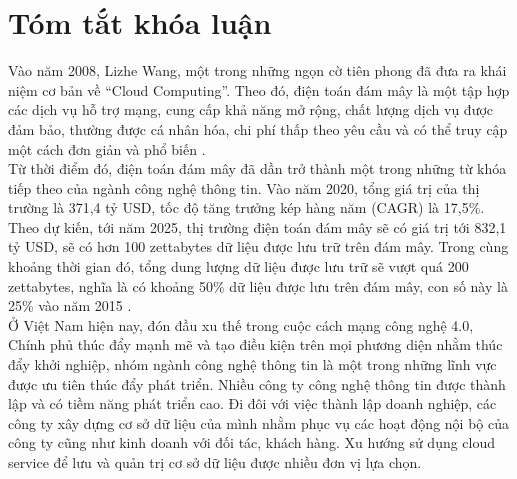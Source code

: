 \chapter*{\centering\Large{Tóm tắt khóa luận}}

Vào năm 2008, Lizhe Wang, một trong những ngọn cờ tiên phong đã đưa ra khái
niệm cơ bản về “Cloud Computing”. Theo đó, điện toán đám mây là một tập hợp các
dịch vụ hỗ trợ mạng, cung cấp khả năng mở rộng, chất lượng dịch vụ được đảm bảo,
thường được cá nhân hóa, chi phí thấp theo yêu cầu và có thể truy cập một cách đơn giản
và phổ biến \cite{wang2008scientific}.\\

Từ thời điểm đó, điện toán đám mây đã dần trở thành một trong những từ khóa
tiếp theo của ngành công nghệ thông tin. Vào năm 2020, tổng giá trị của thị trường là
371,4 tỷ USD, tốc độ tăng trưởng kép hàng năm (CAGR) là 17,5\%. Theo dự kiến, tới
năm 2025, thị trường điện toán đám mây sẽ có giá trị tới 832,1 tỷ USD, sẽ có hơn 100
zettabytes dữ liệu được lưu trữ trên đám mây. Trong cùng khoảng thời gian đó, tổng
dung lượng dữ liệu được lưu trữ sẽ vượt quá 200 zettabytes, nghĩa là có khoảng 50\% dữ
liệu được lưu trên đám mây, con số này là 25\% vào năm 2015 \cite{vladimir2021cloudcomputing}.\\

Ở Việt Nam hiện nay, đón đầu xu thế trong cuộc cách mạng công nghệ 4.0, Chính
phủ thúc đẩy mạnh mẽ và tạo điều kiện trên mọi phương diện nhằm thúc đẩy khởi nghiệp,
nhóm ngành công nghệ thông tin là một trong những lĩnh vực được ưu tiên thúc đẩy phát
triển. Nhiều công ty công nghệ thông tin được thành lập và có tiềm năng phát triển cao.
Đi đôi với việc thành lập doanh nghiệp, các công ty xây dựng cơ sở dữ liệu của mình
nhằm phục vụ các hoạt động nội bộ của công ty cũng như kinh doanh với đối tác, khách
hàng. Xu hướng sử dụng cloud service để lưu và quản trị cơ sở dữ liệu được nhiều đơn
vị lựa chọn.\\

